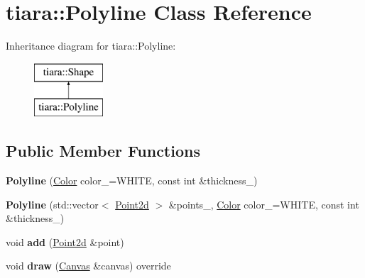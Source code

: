 \hypertarget{classtiara_1_1Polyline}{}\section{tiara\+::Polyline Class Reference}
\label{classtiara_1_1Polyline}
Inheritance diagram for tiara\+::Polyline\+:\begin{figure}[H]
\begin{center}
\leavevmode
\includegraphics[height=2.000000cm]{classtiara_1_1Polyline}
\end{center}
\end{figure}
\subsection*{Public Member Functions}
\begin{DoxyCompactItemize}
\item 
\mbox{\label{classtiara_1_1Polyline_ab03ded1f6d504fcf342c0f9fb58018b2}} 
{\bfseries Polyline} (\mbox{\hyperlink{classtiara_1_1Color}{Color}} color\+\_\+=W\+H\+I\+TE, const int \&thickness\+\_)
\item 
\mbox{\label{classtiara_1_1Polyline_a4c177e2394f27ab0e51b69708e878b24}} 
{\bfseries Polyline} (std\+::vector$<$ \mbox{\hyperlink{classtiara_1_1Point2d}{Point2d}} $>$ \&points\+\_\+, \mbox{\hyperlink{classtiara_1_1Color}{Color}} color\+\_\+=W\+H\+I\+TE, const int \&thickness\+\_)
\item 
\mbox{\label{classtiara_1_1Polyline_a55e4d1968e8cfca4e47ddb9d22e3e6ed}} 
void {\bfseries add} (\mbox{\hyperlink{classtiara_1_1Point2d}{Point2d}} \&point)
\item 
\mbox{\label{classtiara_1_1Polyline_aee4ed7ddf20a9d9c979491f111e1e80b}} 
void {\bfseries draw} (\mbox{\hyperlink{classtiara_1_1Canvas}{Canvas}} \&canvas) override
\end{DoxyCompactItemize}

